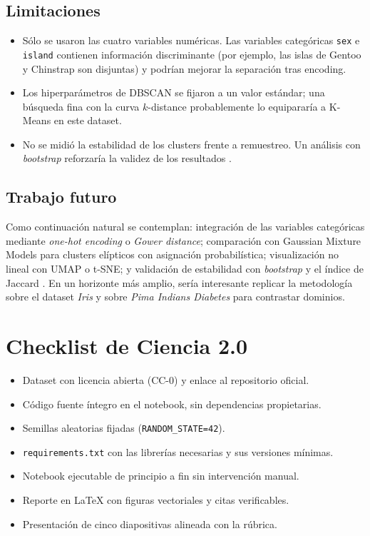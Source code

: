 \subsection{Limitaciones}

\begin{itemize}
  \item Sólo se usaron las cuatro variables numéricas. Las variables categóricas \texttt{sex} e \texttt{island} contienen información discriminante (por ejemplo, las islas de Gentoo y Chinstrap son disjuntas) y podrían mejorar la separación tras encoding.
  \item Los hiperparámetros de DBSCAN se fijaron a un valor estándar; una búsqueda fina con la curva $k$-distance probablemente lo equipararía a K-Means en este dataset.
  \item No se midió la estabilidad de los clusters frente a remuestreo. Un análisis con \emph{bootstrap} reforzaría la validez de los resultados \citep{hennig2007cluster}.
\end{itemize}

\subsection{Trabajo futuro}

Como continuación natural se contemplan: integración de las variables categóricas mediante \emph{one-hot encoding} o \emph{Gower distance}; comparación con Gaussian Mixture Models \citep{mclachlan2000gmm} para clusters elípticos con asignación probabilística; visualización no lineal con UMAP o t-SNE; y validación de estabilidad con \emph{bootstrap} y el índice de Jaccard \citep{hennig2007cluster}. En un horizonte más amplio, sería interesante replicar la metodología sobre el dataset \emph{Iris} y sobre \emph{Pima Indians Diabetes} para contrastar dominios.

\section*{Checklist de Ciencia 2.0}

\begin{itemize}
  \item Dataset con licencia abierta (CC-0) y enlace al repositorio oficial.
  \item Código fuente íntegro en el notebook, sin dependencias propietarias.
  \item Semillas aleatorias fijadas (\texttt{RANDOM\_STATE=42}).
  \item \texttt{requirements.txt} con las librerías necesarias y sus versiones mínimas.
  \item Notebook ejecutable de principio a fin sin intervención manual.
  \item Reporte en \LaTeX{} con figuras vectoriales y citas verificables.
  \item Presentación de cinco diapositivas alineada con la rúbrica.
\end{itemize}
